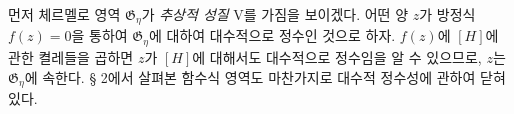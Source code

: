 
먼저 체르멜로 영역 $\mathfrak G_\eta$가 \emph{추상적 성질} V를 가짐을 보이겠다. 어떤 양 $z$가 방정식 $f(z)=0$을 통하여 $\mathfrak G_\eta$에 대하여 대수적으로 정수인 것으로 하자. $f(z)$에 $[H]$에 관한 켤레들을 곱하면 $z$가 $[H]$에 대해서도 대수적으로 정수임을 알 수 있으므로, $z$는 $\mathfrak G_\eta$에 속한다. § 2에서 살펴본 함수식 영역도 마찬가지로 대수적 정수성에 관하여 닫혀 있다.
